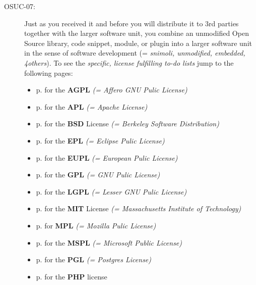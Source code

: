 \begin{description}
\item[OSUC-07:]\label{OSUC-07-DEF} Just as you received it and before you will
distribute it to 3rd parties together with the larger software unit, you
combine an unmodified Open Source library, code snippet, module, or plugin into
a larger software unit in the sense of software development (= \textit{snimoli,
unmodified, embedded, 4others}). 
To see the \textit{specific, license fulfilling to-do lists} jump to the
following pages:
   \begin{itemize}
    \item p. \pageref{OSUC-07-AGPL} for the \textbf{AGPL}
      \textit{(= Affero GNU Pulic License)} 
    \item p. \pageref{OSUC-07-Apache20} for the \textbf{APL}
      \textit{(= Apache License)}
    \item p. \pageref{OSUC-07-BSD} for the \textbf{BSD} License
      \textit{(= Berkeley Software Distribution)}
    \item p. \pageref{OSUC-07-EPL} for the \textbf{EPL}
      \textit{(= Eclipse Pulic License)}     
    \item p. \pageref{OSUC-07-EUPL} for the \textbf{EUPL}
      \textit{(= European Pulic License)} 
    \item p. \pageref{OSUC-07-GPL} for the \textbf{GPL}
       \textit{(= GNU Pulic License)} 
    \item p. \pageref{OSUC-07-LGPL} for the \textbf{LGPL}
      \textit{(= Lesser GNU Pulic License)}           
    \item p. \pageref{OSUC-07-MIT} for the \textbf{MIT} License
       \textit{(= Massachusetts Institute of Technology)} 
    \item p. \pageref{OSUC-07-MPL} for \textbf{MPL}
      \textit{(= Mozilla Pulic License)}     
    \item p. \pageref{OSUC-07-MsPL} for the \textbf{MSPL}
      \textit{(= Microsoft Public License)} 
    \item p. \pageref{OSUC-07-PGL} for the \textbf{PGL}
      \textit{(= Postgres License)} 
    \item p. \pageref{OSUC-07-PHP} for the \textbf{PHP} license 
  \end{itemize}


\end{description}
